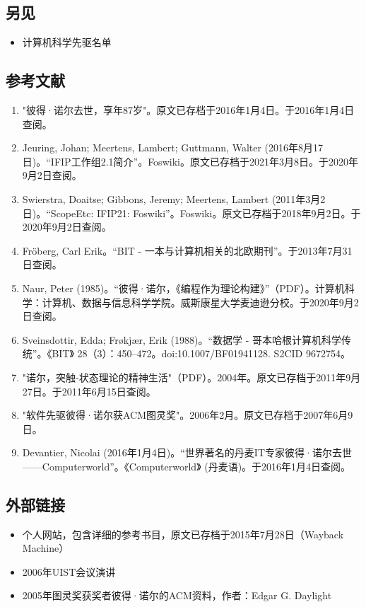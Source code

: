 \subsection{另见}
\begin{itemize}
\item 计算机科学先驱名单
\end{itemize}
\subsection{参考文献}
\begin{enumerate}
\item "彼得·诺尔去世，享年87岁"。原文已存档于2016年1月4日。于2016年1月4日查阅。
\item Jeuring, Johan; Meertens, Lambert; Guttmann, Walter (2016年8月17日)。“IFIP工作组2.1简介”。Foswiki。原文已存档于2021年3月8日。于2020年9月2日查阅。
\item Swierstra, Doaitse; Gibbons, Jeremy; Meertens, Lambert (2011年3月2日)。“ScopeEtc: IFIP21: Foswiki”。Foswiki。原文已存档于2018年9月2日。于2020年9月2日查阅。
\item Fröberg, Carl Erik。“BIT - 一本与计算机相关的北欧期刊”。于2013年7月31日查阅。
\item Naur, Peter (1985)。“彼得·诺尔，《编程作为理论构建》”（PDF）。计算机科学：计算机、数据与信息科学学院。威斯康星大学麦迪逊分校。于2020年9月2日查阅。
\item Sveinsdottir, Edda; Frøkjær, Erik (1988)。“数据学 - 哥本哈根计算机科学传统”。《BIT》 28（3）：450–472。doi:10.1007/BF01941128. S2CID 9672754。
\item "诺尔，突触-状态理论的精神生活"（PDF）。2004年。原文已存档于2011年9月27日。于2011年6月15日查阅。
\item "软件先驱彼得·诺尔获ACM图灵奖"。2006年2月。原文已存档于2007年6月9日。
\item Devantier, Nicolai (2016年1月4日)。“世界著名的丹麦IT专家彼得·诺尔去世——Computerworld”。《Computerworld》 (丹麦语)。于2016年1月4日查阅。
\end{enumerate}
\subsection{外部链接}
\begin{itemize}
\item 个人网站，包含详细的参考书目，原文已存档于2015年7月28日（Wayback Machine）
\item 2006年UIST会议演讲
\item 2005年图灵奖获奖者彼得·诺尔的ACM资料，作者：Edgar G. Daylight
\end{itemize}